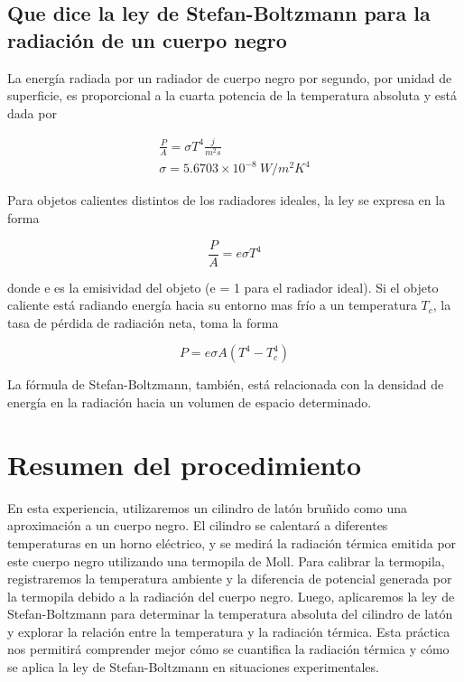 \documentclass[twocolumn, 12pt]{article}
\begin{document}
\subsection{Que dice la ley de Stefan-Boltzmann para la radiación de un cuerpo negro~\cite{Stefan-Boltzmann}}

La energía radiada por un radiador de cuerpo negro por
segundo, por unidad de superficie, es proporcional a la
cuarta potencia de la temperatura absoluta y está dada por

\begin{equation*}
      \begin{gathered}
            \frac{P}{A} = \sigma T^{4} \frac{j}{m^{2}s} \\
            \sigma = 5.6703 \times 10^{-8}~W/m^{2}K^{4}
      \end{gathered}
\end{equation*}

Para objetos calientes distintos de los radiadores ideales,
la ley se expresa en la forma

\begin{equation*}
      \frac{P}{A} = e \sigma T^{4}
\end{equation*}

donde e es la emisividad del objeto (e = 1 para el radiador
ideal). Si el objeto caliente está radiando energía hacia
su entorno mas frío a un temperatura $T_c$, la tasa de
pérdida de radiación neta, toma la forma

\begin{equation*}
      P = e \sigma A (T^{4} - T_{c}^{4})
\end{equation*}

La fórmula de Stefan-Boltzmann, también, está relacionada
con la densidad de energía en la radiación hacia un volumen
de espacio determinado.

\section{Resumen del procedimiento}

En esta experiencia, utilizaremos un cilindro de latón
bruñido como una aproximación a un cuerpo negro. El
cilindro se calentará a diferentes temperaturas en un horno
eléctrico, y se medirá la radiación térmica emitida por
este cuerpo negro utilizando una termopila de Moll. Para
calibrar la termopila, registraremos la temperatura
ambiente y la diferencia de potencial generada por la
termopila debido a la radiación del cuerpo negro. Luego,
aplicaremos la ley de Stefan-Boltzmann para determinar la
temperatura absoluta del cilindro de latón y explorar la
relación entre la temperatura y la radiación térmica. Esta
práctica nos permitirá comprender mejor cómo se cuantifica
la radiación térmica y cómo se aplica la ley de
Stefan-Boltzmann en situaciones experimentales.

\printbibliography
\end{document}
